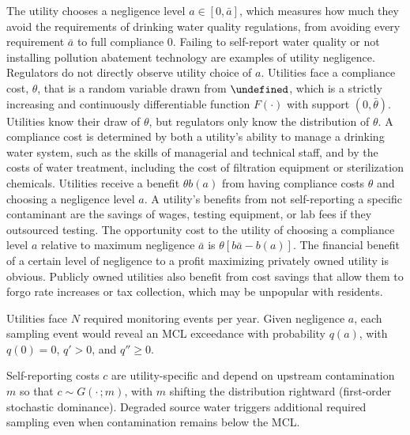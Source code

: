 \documentclass{article}
\let\Theta\undefined
\begin{document}
The utility chooses a negligence level $a \in [0, \bar{a}]$, which measures how much they avoid the requirements of drinking water quality regulations, from avoiding every requirement $\bar{a}$ to full compliance 0. Failing to self-report water quality or not installing pollution abatement technology are examples of utility negligence. Regulators do not directly observe utility choice of $a$. Utilities face a compliance cost, $\theta$, that is a random variable drawn from $\Theta$, which is a strictly increasing and continuously differentiable function $F(\cdot)$ with support $(0, \bar{\theta})$. Utilities know their draw of $\theta$, but regulators only know the distribution of $\theta$. A compliance cost is determined by both a utility's ability to manage a drinking water system, such as the skills of managerial and technical staff, and by the costs of water treatment, including the cost of filtration equipment or sterilization chemicals. Utilities receive a benefit $\theta b(a)$ from having compliance costs $\theta$ and choosing a negligence level $a$. A utility's benefits from not self-reporting a specific contaminant are the savings of wages, testing equipment, or lab fees if they outsourced testing. The opportunity cost to the utility of choosing a compliance level $a$ relative to maximum negligence $\bar{a}$ is $\theta[b\bar{a}-b(a)]$. The financial benefit of a certain level of negligence to a profit maximizing privately owned utility is obvious. Publicly owned utilities also benefit from cost savings that allow them to forgo rate increases or tax collection, which may be unpopular with residents.

Utilities face $N$ required monitoring events per year. Given negligence $a$, each sampling event would reveal an MCL exceedance with probability $q(a)$, with $q(0)=0$, $q'>0$, and $q'' \ge 0$.


Self-reporting costs $c$ are utility-specific and depend on upstream contamination $m$ so that $c \sim G(\cdot\,;m)$, with $m$ shifting the distribution rightward (first-order stochastic dominance). Degraded source water triggers additional required sampling even when contamination remains below the MCL.
\end{document}
